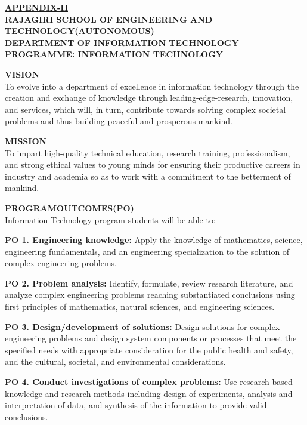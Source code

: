 \begin{center}
    \LARGE\textbf{\underline{\textsf{APPENDIX-II}}}\\
    \vspace{5mm}
    \large\textbf{
  RAJAGIRI SCHOOL OF ENGINEERING AND TECHNOLOGY(AUTONOMOUS)\\\vspace{5mm}DEPARTMENT OF INFORMATION TECHNOLOGY\\PROGRAMME: INFORMATION TECHNOLOGY}

\end{center}
\par \noindent
\textbf{VISION}\\\noindent
To evolve into a department of excellence in information technology through the creation and exchange of knowledge through leading-edge-research, innovation, and services, which will, in turn, contribute towards solving complex societal problems and thus building peaceful and prosperous mankind.
\par \noindent
\textbf{MISSION}\\\noindent
To impart high-quality technical education, research training, professionalism, and strong ethical values to young minds for ensuring their productive careers in industry and academia so as to work with a commitment to the betterment of mankind.
\par \noindent
\textbf{PROGRAMOUTCOMES(PO)}\\\noindent
Information Technology program students will be able to:
\vspace{2mm}
\par \noindent
\textbf{PO 1. Engineering knowledge:} Apply the knowledge of mathematics, science, engineering fundamentals, and an engineering specialization to the solution of complex engineering problems.
\par \noindent
\textbf{PO 2. Problem analysis:} Identify, formulate, review research literature, and analyze complex engineering problems reaching substantiated conclusions using first principles of mathematics, natural sciences, and engineering sciences.
\par \noindent
\textbf{PO 3. Design/development of solutions:} Design solutions for complex engineering problems and design system components or processes that meet the specified needs with appropriate consideration for the public health and safety, and the cultural, societal, and environmental considerations.
\par \noindent
\textbf{PO 4. Conduct investigations of complex problems:} Use research-based knowledge and research methods including design of experiments, analysis and interpretation of data, and synthesis of the information to provide valid conclusions.
